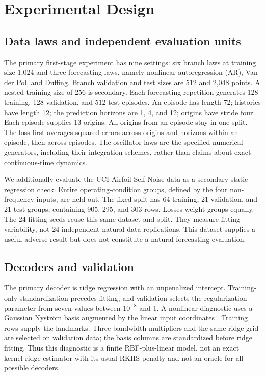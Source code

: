 \documentclass[10pt]{article}
\begin{document}
\section{Experimental Design}\label{sec:design}

\subsection{Data laws and independent evaluation units}

The primary first-stage experiment has nine settings: six branch laws at
training size 1,024 and three forecasting laws, namely nonlinear
autoregression (AR), Van der Pol, and Duffing. Branch validation and test
sizes are 512 and 2,048 points. A nested training size of 256 is secondary.
Each forecasting repetition generates 128 training, 128 validation, and
512 test episodes. An episode has length 72; histories have length 12;
the prediction horizons are 1, 4, and 12; origins have stride four. Each
episode supplies 13 origins. All origins from an episode stay in one split.
The loss first averages squared errors across origins and horizons within
an episode, then across episodes. The oscillator laws are the specified
numerical generators, including their integration schemes, rather than
claims about exact continuous-time dynamics.

We additionally evaluate the UCI Airfoil Self-Noise data
\citep{Brooks1989Airfoil} as a secondary
static-regression check. Entire operating-condition groups, defined by the
four non-frequency inputs, are held out. The fixed split has 64 training,
21 validation, and 21 test groups, containing 905, 295, and 303 rows. Losses
weight groups equally. The 24 fitting seeds reuse this same dataset and
split. They measure fitting variability, not 24 independent natural-data
replications. This dataset supplies a useful adverse result but does not
constitute a natural forecasting evaluation.

\subsection{Decoders and validation}

The primary decoder is ridge regression with an unpenalized intercept.
Training-only standardization precedes fitting, and validation selects the
regularization parameter from seven values between $10^{-8}$ and 1.
A nonlinear diagnostic uses a Gaussian Nystr\"om basis augmented by the
linear input coordinates \citep{Williams2001Nystrom}. Training rows supply
the landmarks. Three bandwidth multipliers and the same ridge grid are
selected on validation data; the basis columns are standardized before
ridge fitting. Thus this diagnostic is a finite RBF-plus-linear model,
not an exact kernel-ridge estimator with its usual RKHS penalty and not
an oracle for all possible decoders.
\end{document}
